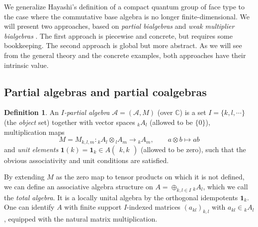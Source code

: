 \documentclass[10pt]{article}
\newcommand{\C}{\mathbb{C}}
\newcommand{\Grs}[3]{#1{\begin{pmatrix} #2,  #3\end{pmatrix}}}
\newcommand{\GrDA}[3]{{}_{#2}#1_{#3}} %
\newcommand{\Unit}{\mathbf{1}}
\newcommand{\wmult}{\cdot}
\theoremstyle{definition}
\newtheorem{Def}[Theorem]{Definition}
\newtheorem{Rem}[Theorem]{Remark}
\numberwithin{equation}{section}
\begin{document}
We generalize Hayashi's definition of a compact quantum group of face type \cite{Hay1} to the case where the commutative base algebra is no longer finite-dimensional. We will present two approaches, based on \emph{partial bialgebras} and \emph{weak multiplier bialgebras} \cite{Boh1,VDW1}. The first approach is piecewise and concrete, but requires some bookkeeping. The second approach is global but more abstract. As we will see from the general theory and the concrete examples, both approaches have their intrinsic value.

\subsection{Partial algebras and partial coalgebras}


\begin{Def} An \emph{$I$-partial algebra} $\mathscr{A}=(\mathscr{A},M)$ (over $\C$) is a set $I=\{k,l,\cdots\}$ (the \emph{object} set) together with vector spaces $\GrDA{A}{k}{l}$ (allowed to be $\{0\}$), multiplication maps \[M=M_{k,l,m}:\GrDA{A}{k}{l} \otimes \GrDA{A}{l}{m}\rightarrow \GrDA{A}{k}{m},\qquad a\otimes b \mapsto ab\]  and \emph{unit elements} $\Unit(k) = \Unit_k \in \Grs{A}{k}{k}$ (allowed to be zero),
such that the obvious associativity and unit conditions are satisfied. 
\end{Def}


By extending $M$ as the zero map to tensor products on which it is not defined, we can define an associative algebra structure on $A =  \oplus_{k,l\in I} \GrDA{A}{k}{l}$, which we call the \emph{total algebra}.  It is a locally unital algebra by the orthogonal idempotents $\mathbf{1}_k$. One can identify $A$ with finite support $I$-indexed matrices $(a_{kl})_{k,l}$ with $a_{kl} \in \GrDA{A}{k}{l}$, equipped with the natural matrix multiplication. 
\end{document}
